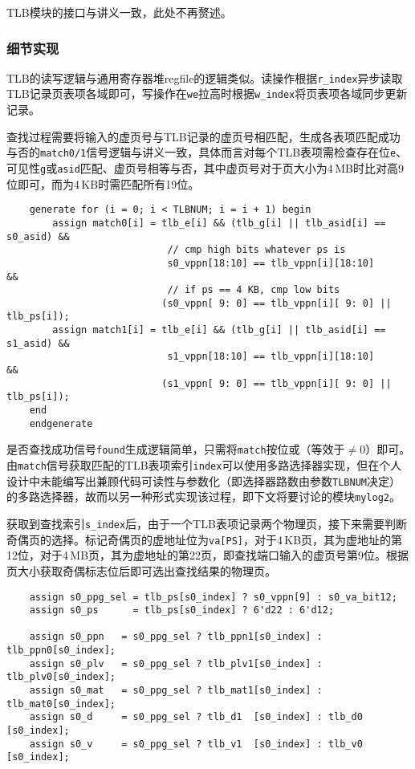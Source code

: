 \documentclass[UTF-8,twoside,c5size]{ctexart}
\begin{document}
    TLB模块的接口与讲义一致，此处不再赘述。
    
    \subsubsection{细节实现}
    
    TLB的读写逻辑与通用寄存器堆regfile的逻辑类似。读操作根据\texttt{r\_index}异步读取TLB记录页表项各域即可，写操作在\texttt{we}拉高时根据\texttt{w\_index}将页表项各域同步更新记录。
    
    查找过程需要将输入的虚页号与TLB记录的虚页号相匹配，生成各表项匹配成功与否的\texttt{match0/1}信号逻辑与讲义一致，具体而言对每个TLB表项需检查存在位\texttt{e}、可见性\texttt{g}或\texttt{asid}匹配、虚页号相等与否，其中虚页号对于页大小为4\,MB时比对高9位即可，而为4\,KB时需匹配所有19位。
    
    \begin{verbatim}
    generate for (i = 0; i < TLBNUM; i = i + 1) begin
        assign match0[i] = tlb_e[i] && (tlb_g[i] || tlb_asid[i] == s0_asid) &&
                            // cmp high bits whatever ps is
                            s0_vppn[18:10] == tlb_vppn[i][18:10]            &&  
                            // if ps == 4 KB, cmp low bits
                           (s0_vppn[ 9: 0] == tlb_vppn[i][ 9: 0] || tlb_ps[i]); 
        assign match1[i] = tlb_e[i] && (tlb_g[i] || tlb_asid[i] == s1_asid) &&
                            s1_vppn[18:10] == tlb_vppn[i][18:10]            &&
                           (s1_vppn[ 9: 0] == tlb_vppn[i][ 9: 0] || tlb_ps[i]);
    end
    endgenerate
    \end{verbatim}
    
    是否查找成功信号\texttt{found}生成逻辑简单，只需将\texttt{match}按位或（等效于$ \neq 0 $）即可。由\texttt{match}信号获取匹配的TLB表项索引\texttt{index}可以使用多路选择器实现，但在个人设计中未能编写出兼顾代码可读性与参数化（即选择器路数由参数\texttt{TLBNUM}决定）的多路选择器，故而以另一种形式实现该过程，即下文将要讨论的模块\texttt{mylog2}。
    
    获取到查找索引\texttt{s_index}后，由于一个TLB表项记录两个物理页，接下来需要判断奇偶页的选择。标记奇偶页的虚地址位为\texttt{va[PS]}，对于4\,KB页，其为虚地址的第12位，对于4\,MB页，其为虚地址的第22页，即查找端口输入的虚页号第9位。根据页大小获取奇偶标志位后即可选出查找结果的物理页。
    
    \begin{verbatim}
    assign s0_ppg_sel = tlb_ps[s0_index] ? s0_vppn[9] : s0_va_bit12;
    assign s0_ps      = tlb_ps[s0_index] ? 6'd22 : 6'd12;

    assign s0_ppn   = s0_ppg_sel ? tlb_ppn1[s0_index] : tlb_ppn0[s0_index];
    assign s0_plv   = s0_ppg_sel ? tlb_plv1[s0_index] : tlb_plv0[s0_index];
    assign s0_mat   = s0_ppg_sel ? tlb_mat1[s0_index] : tlb_mat0[s0_index];
    assign s0_d     = s0_ppg_sel ? tlb_d1  [s0_index] : tlb_d0  [s0_index];
    assign s0_v     = s0_ppg_sel ? tlb_v1  [s0_index] : tlb_v0  [s0_index];
    \end{verbatim}
    
\end{document}
